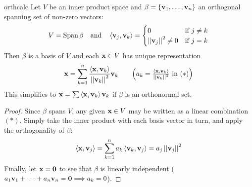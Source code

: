 \begin{lemm}{}{orthcalc}
	Let $V$ be an inner product space and $\beta=\{{\mathbf{{\mathbf{v}}}}_1,\ldots,{\mathbf{{\mathbf{v}}}}_{n}\}$ an orthogonal spanning set of non-zero vectors:
	\[
		V=\operatorname{Span}\beta
		\quad\text{and}\quad
		\left\langle {\mathbf{v}}_j,{\mathbf{v}}_k\right\rangle=
		\begin{cases}
			0&\text{if $j\neq k$}\\
			\left| \left| {\mathbf{v}}_j\right|\right|^2\neq 0&\text{if $j=k$}
		\end{cases}
	\]
	Then $\beta$ is a basis of $V$ and each ${\mathbf{x}}\in V$ has unique representation
  \[
  	\vx=\sum\limits_{k=1}^n\frac{\ip{\vx,\vv_k}}{\Nm{\vv_k}^2}\vv_k
  	\tag*{$\left(a_k=\frac{\ip{\vx,\vv_k}}{\Nm{\vv_k}^2}\text{ in }(\ast)\right)$}
  \]
  This simplifies to ${\mathbf{x}}=\sum\left\langle {\mathbf{x}},{\mathbf{v}}_k\right\rangle{\mathbf{v}}_k$ if $\beta$ is an orthonormal set.
\end{lemm}

\begin{proof}
  Since $\beta$ spans $V$, any given ${\mathbf{x}}\in V$ may be written as a linear combination $(\ast)$. Simply take the inner product with each basis vector in turn, and apply the orthogonality of $\beta$:
  \[
		\left\langle {\mathbf{x}},{\mathbf{v}}_j\right\rangle=\sum_{k=1}^na_k\left\langle {\mathbf{v}}_k,{\mathbf{v}}_j\right\rangle=a_j\left| \left| {\mathbf{v}}_j\right|\right|^2
	\]
 	Finally, let ${\mathbf{x}}=\mathbf{0}$ to see that $\beta$ is linearly independent (${a}_1\mathbf{v}_1+\cdots+{a}_{n}\mathbf{v}_{n}=\mathbf{0}\Longrightarrow a_k=0$).
\end{proof}


